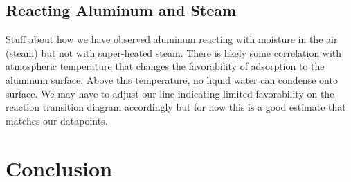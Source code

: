 \documentclass[preprint,12pt,3p]{elsarticle}
\begin{document}
\subsection{Reacting Aluminum and Steam}
Stuff about how we have observed aluminum reacting with moisture in the air
(steam) but not with super-heated steam. There is likely some correlation with
atmospheric temperature that changes the favorability of adsorption to the
aluminum surface. Above this temperature, no liquid water can condense onto
surface. We may have to adjust our line indicating limited favorability on the
reaction transition diagram accordingly but for now this is a good estimate that
matches our datapoints.

\section{Conclusion}
\label{conclusion}





\begin{thebibliography}{00}


\bibitem{}

\end{thebibliography}
\end{document}
